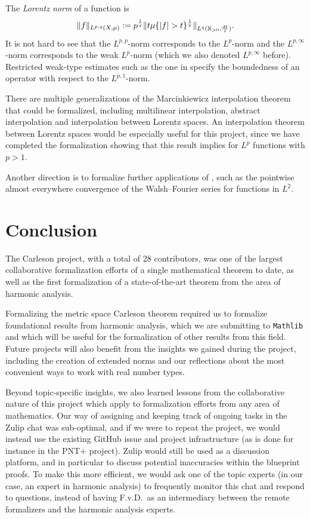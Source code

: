 \documentclass[12pt, reqno]{amsart}
\newcommand{\mathlib}{\texttt{Mathlib}\xspace}
\theoremstyle{definition}
\theoremstyle{plain}
\begin{document}
The \emph{Lorentz norm} of a function is
$$\|f\|_{L^{p,q}(X,\mu)}\vcentcolon=
p^{\frac1q}\|t\mu\{|f| > t\}^{\frac1p}\|_{L^q(\mathbb{R}_{>0},\frac{dt}{t})}.$$
It is not hard to see that the $L^{p,p}$-norm corresponds to the $L^p$-norm
and the $L^{p,\infty}$-norm corresponds to the weak $L^p$-norm
(which we also denoted $L^{p,\infty}$ before).
Restricted weak-type estimates such as the one in 
specify the boundedness of an operator with respect to the $L^{p,1}$-norm.

There are multiple generalizations of the Marcinkiewicz interpolation theorem that
could be formalized, including multilinear interpolation, abstract interpolation and interpolation between Lorentz spaces.
An interpolation theorem between Lorentz spaces would be especially useful for this project, since we have completed the formalization showing that this result
implies  for $L^p$ functions with $p>1$.

Another direction is to formalize further applications of ,
such as the pointwise almost everywhere convergence of the Walsh--Fourier series for functions in $L^2$.

\section{Conclusion}\label{sec:conclusion}

The Carleson project, with a total of 28 contributors,
was one of the largest collaborative formalization efforts of a single mathematical theorem to date,
as well as the first formalization of a state-of-the-art theorem
from the area of harmonic analysis.

Formalizing the metric space Carleson theorem required us
to formalize foundational results from harmonic analysis,
which we are submitting to \mathlib
and which will be useful for the formalization of other results from this field.
Future projects will also benefit from the insights we gained during the project,
including the creation of extended norms
and our reflections about the most convenient ways to work with real number types.

Beyond topic-specific insights,
we also learned lessons from the collaborative nature of this project
which apply to formalization efforts from any area of mathematics.
Our way of assigning and keeping track of ongoing tasks in the Zulip chat was sub-optimal,
and if we were to repeat the project,
we would instead use the existing GitHub issue and project infrastructure (as is done for instance in the PNT$+$ project).
Zulip would still be used as a discussion platform,
and in particular to discuss potential inaccuracies within the blueprint proofs.
To make this more efficient, we would ask one of the topic experts
(in our case, an expert in harmonic analysis)
to frequently monitor this chat and respond to questions,
instead of having F.v.D.\ as an intermediary between the remote formalizers and the harmonic analysis experts.
\end{document}
